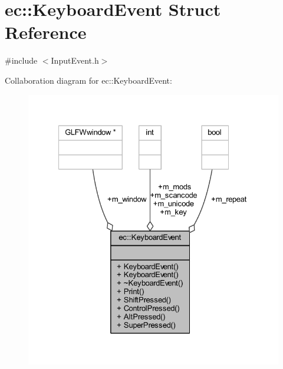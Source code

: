 \hypertarget{structec_1_1_keyboard_event}{}\section{ec\+:\+:Keyboard\+Event Struct Reference}
\label{structec_1_1_keyboard_event}


{\ttfamily \#include $<$Input\+Event.\+h$>$}



Collaboration diagram for ec\+:\+:Keyboard\+Event\+:
\nopagebreak
\begin{figure}[H]
\begin{center}
\leavevmode
\includegraphics[width=327pt]{structec_1_1_keyboard_event__coll__graph}
\end{center}
\end{figure}
